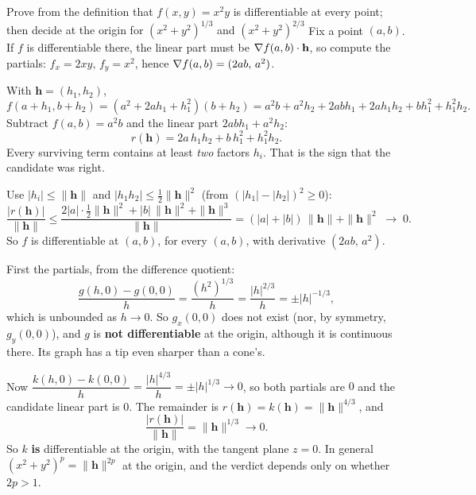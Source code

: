 \begin{worked}{Prove from the definition that $f(x,y)=x^{2}y$ is differentiable at every point; then decide at the origin for $(x^{2}+y^{2})^{1/3}$ and $(x^{2}+y^{2})^{2/3}$}
Fix a point $(a,b)$. If $f$ is differentiable there, the linear part must
be $\nabla f(a,b)\cdot\mathbf{h}$, so compute the partials:
$f_{x}=2xy$, $f_{y}=x^{2}$, hence $\nabla f(a,b)=(2ab,\,a^{2})$.

With $\mathbf{h}=(h_{1},h_{2})$,
\[
  f(a+h_{1},b+h_{2})=(a^{2}+2ah_{1}+h_{1}^{2})(b+h_{2})
  =a^{2}b+a^{2}h_{2}+2abh_{1}+2ah_{1}h_{2}+bh_{1}^{2}+h_{1}^{2}h_{2} .
\]
Subtract $f(a,b)=a^{2}b$ and the linear part $2abh_{1}+a^{2}h_{2}$:
\[
  r(\mathbf{h})=2a\,h_{1}h_{2}+b\,h_{1}^{2}+h_{1}^{2}h_{2} .
\]
Every surviving term contains at least \emph{two} factors $h_{i}$. That is
the sign that the candidate was right.

Use $|h_{i}|\le\|\mathbf{h}\|$ and $|h_{1}h_{2}|\le\tfrac12\|\mathbf{h}\|^{2}$
(from $(|h_{1}|-|h_{2}|)^{2}\ge0$):
\[
  \frac{|r(\mathbf{h})|}{\|\mathbf{h}\|}
  \le\frac{2|a|\cdot\tfrac12\|\mathbf{h}\|^{2}+|b|\,\|\mathbf{h}\|^{2}
          +\|\mathbf{h}\|^{3}}{\|\mathbf{h}\|}
  =(|a|+|b|)\,\|\mathbf{h}\|+\|\mathbf{h}\|^{2}\;\longrightarrow\;0 .
\]
So $f$ is differentiable at $(a,b)$, for every $(a,b)$, with derivative
$(2ab,\,a^{2})$.

First the partials, from the difference quotient:
\[
  \frac{g(h,0)-g(0,0)}{h}=\frac{(h^{2})^{1/3}}{h}
  =\frac{|h|^{2/3}}{h}=\pm|h|^{-1/3},
\]
which is unbounded as $h\to0$. So $g_{x}(0,0)$ does not exist (nor, by
symmetry, $g_{y}(0,0)$), and $g$ is \textbf{not differentiable} at the
origin, although it is continuous there. Its graph has a tip even sharper
than a cone's.

Now $\dfrac{k(h,0)-k(0,0)}{h}=\dfrac{|h|^{4/3}}{h}=\pm|h|^{1/3}\to0$, so both
partials are $0$ and the candidate linear part is $0$. The remainder is
$r(\mathbf{h})=k(\mathbf{h})=\|\mathbf{h}\|^{4/3}$, and
\[
  \frac{|r(\mathbf{h})|}{\|\mathbf{h}\|}=\|\mathbf{h}\|^{1/3}\to0 .
\]
So $k$ \textbf{is} differentiable at the origin, with the tangent plane
$z=0$. In general $(x^{2}+y^{2})^{p}=\|\mathbf{h}\|^{2p}$ at the origin, and
the verdict depends only on whether $2p>1$.
\end{worked}


